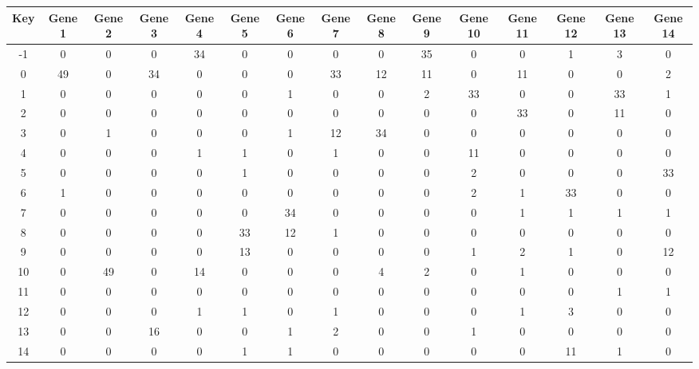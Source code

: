 \begin{tabular}{|c|c|c|c|c|c|c|c|c|c|c|c|c|c|c|}
\hline
Key & Gene 1 & Gene 2 & Gene 3 & Gene 4 & Gene 5 & Gene 6 & Gene 7 & Gene 8 & Gene 9 & Gene 10 & Gene 11 & Gene 12 & Gene 13 & Gene 14 \\
\hline
-1 & 0 & 0 & 0 & 34 & 0 & 0 & 0 & 0 & 35 & 0 & 0 & 1 & 3 & 0 \\
0 & 49 & 0 & 34 & 0 & 0 & 0 & 33 & 12 & 11 & 0 & 11 & 0 & 0 & 2 \\
1 & 0 & 0 & 0 & 0 & 0 & 1 & 0 & 0 & 2 & 33 & 0 & 0 & 33 & 1 \\
2 & 0 & 0 & 0 & 0 & 0 & 0 & 0 & 0 & 0 & 0 & 33 & 0 & 11 & 0 \\
3 & 0 & 1 & 0 & 0 & 0 & 1 & 12 & 34 & 0 & 0 & 0 & 0 & 0 & 0 \\
4 & 0 & 0 & 0 & 1 & 1 & 0 & 1 & 0 & 0 & 11 & 0 & 0 & 0 & 0 \\
5 & 0 & 0 & 0 & 0 & 1 & 0 & 0 & 0 & 0 & 2 & 0 & 0 & 0 & 33 \\
6 & 1 & 0 & 0 & 0 & 0 & 0 & 0 & 0 & 0 & 2 & 1 & 33 & 0 & 0 \\
7 & 0 & 0 & 0 & 0 & 0 & 34 & 0 & 0 & 0 & 0 & 1 & 1 & 1 & 1 \\
8 & 0 & 0 & 0 & 0 & 33 & 12 & 1 & 0 & 0 & 0 & 0 & 0 & 0 & 0 \\
9 & 0 & 0 & 0 & 0 & 13 & 0 & 0 & 0 & 0 & 1 & 2 & 1 & 0 & 12 \\
10 & 0 & 49 & 0 & 14 & 0 & 0 & 0 & 4 & 2 & 0 & 1 & 0 & 0 & 0 \\
11 & 0 & 0 & 0 & 0 & 0 & 0 & 0 & 0 & 0 & 0 & 0 & 0 & 1 & 1 \\
12 & 0 & 0 & 0 & 1 & 1 & 0 & 1 & 0 & 0 & 0 & 1 & 3 & 0 & 0 \\
13 & 0 & 0 & 16 & 0 & 0 & 1 & 2 & 0 & 0 & 1 & 0 & 0 & 0 & 0 \\
14 & 0 & 0 & 0 & 0 & 1 & 1 & 0 & 0 & 0 & 0 & 0 & 11 & 1 & 0 \\
\hline
\end{tabular}